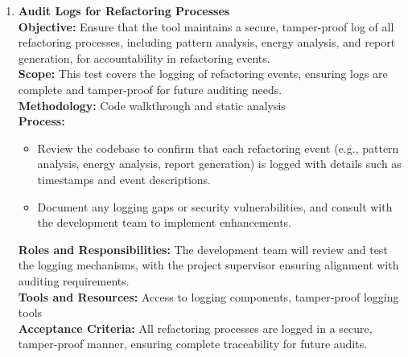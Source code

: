 \documentclass[12pt, titlepage]{article}
\begin{document}
\begin{enumerate}[label={\bf \textcolor{Maroon}{test-SRT-\arabic*}}, wide=0pt, font=\itshape]
  \item \textbf{Audit Logs for Refactoring Processes} \\[2mm]
    \textbf{Objective:} Ensure that the tool maintains a secure, tamper-proof log of all refactoring processes, including pattern analysis, energy analysis, and report generation, for accountability in refactoring events. \\[2mm]
    \textbf{Scope:} This test covers the logging of refactoring events, ensuring logs are complete and tamper-proof for future auditing needs. \\[2mm]
    \textbf{Methodology:} Code walkthrough and static analysis \\[2mm]
    \textbf{Process:}
    \begin{itemize}
      \item Review the codebase to confirm that each refactoring event (e.g., pattern analysis, energy analysis, report generation) is logged with details such as timestamps and event descriptions.
      \item Document any logging gaps or security vulnerabilities, and consult with the development team to implement enhancements.
    \end{itemize}
    \textbf{Roles and Responsibilities:} The development team will review and test the logging mechanisms, with the project supervisor ensuring alignment with auditing requirements. \\[2mm]
    \textbf{Tools and Resources:} Access to logging components, tamper-proof logging tools \\[2mm]
    \textbf{Acceptance Criteria:} All refactoring processes are logged in a secure, tamper-proof manner, ensuring complete traceability for future audits.


\end{enumerate}
\end{document}
